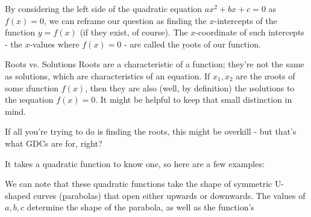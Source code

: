 \documentclass[../../main.tex]{subfiles}
\begin{document}
By considering the left side of the quadratic equation $ax^2+bx+c=0$ as $f(x)=0$, we can reframe our question as finding the $x$-intercepts of the function $y=f(x)$ (if they exist, of course). The $x$-coordinate of such intercepts - the $x$-values where $f(x)=0$ - are called the \b{roots} of our function. 
\begin{insight}{Roots vs. Solutions}
Roots are a characteristic of a function; they're not the same as solutions, which are characteristics of an equation. If $x_1, x_2$ are the \i{roots} of some \i{function} $f(x)$, then they are also (well, by definition) the \i{solutions} to the \i{equation} $f(x)=0$. It might be helpful to keep that small distinction in mind.
\end{insight}

If all you're trying to do is finding the roots, this might be overkill - but that's what GDCs are for, right?

It takes a quadratic function to know one, so here are a few examples:
\begin{center}
    \qquad\qquad
    \qquad\qquad
\end{center}

We can note that these quadratic functions take the shape of symmetric U-shaped curves (\b{parabolas}) that open either upwards or downwards. The values of $a, b, c$ determine the shape of the parabola, as well as the function's 
\end{document}
